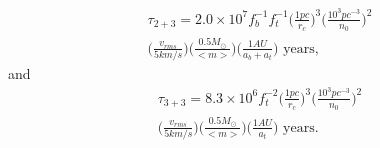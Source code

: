 \begin{equation}
\begin{gathered}
\label{eqn:coll2+3}
\tau_{2+3} = 2.0 \times 10^7f_b^{-1}f_t^{-1} \Big(\frac{1 pc}{r_c}
\Big)^3 \Big(\frac{10^3 pc^{-3}}{n_0} \Big)^2 \\
\Big(\frac{v_{rms}}{5
  km/s} \Big) \Big(\frac{0.5 M_{\odot}}{<m>} \Big) \Big(\frac{1
  AU}{a_{b}+a_{t}} \Big)\mbox{ years},
\end{gathered}
\end{equation}
and
\begin{equation}
\begin{gathered}
\label{eqn:coll3+3}
\tau_{3+3} = 8.3 \times 10^6f_t^{-2} \Big(\frac{1 pc}{r_c}
\Big)^3 \Big(\frac{10^3 pc^{-3}}{n_0} \Big)^2 \\
\Big(\frac{v_{rms}}{5
  km/s} \Big) \Big(\frac{0.5 M_{\odot}}{<m>} \Big) \Big(\frac{1
  AU}{a_{t}} \Big)\mbox{ years}.
\end{gathered}
\end{equation}


